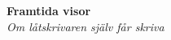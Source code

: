\begin{center}
    \vspace*{1.5cm}
    {\fontsize{20}{20}\textbf{Framtida visor}}\\
    \vspace{0.7cm}
    {\fontsize{12}{12}\textit{Om låtskrivaren själv får skriva}}
\end{center}
\noBackground

\newpage
\resetBackground

\empty
\empty
